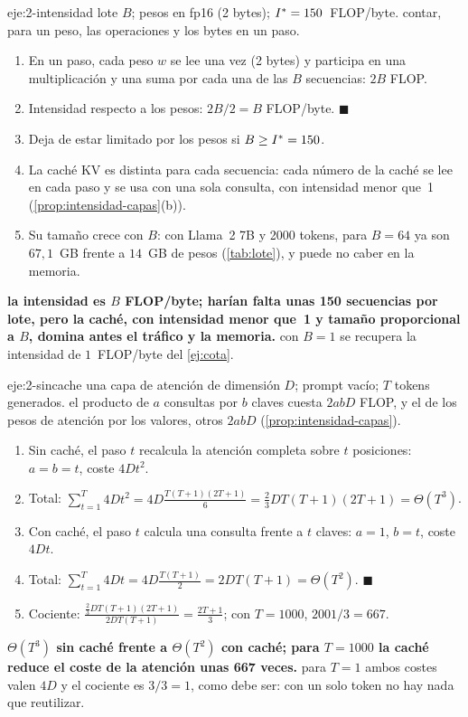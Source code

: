 \begin{solucion}{eje:2-intensidad}
\datos lote $B$; pesos en fp16 (2 bytes); $I^{\ast}=150$~FLOP/byte.
\planteamiento contar, para un peso, las operaciones y los bytes en un paso.
\pasos
\begin{enumerate}[label=\arabic*.]
  \item En un paso, cada peso $w$ se lee una vez (2 bytes) y participa en una multiplicación y una suma por cada una de las $B$ secuencias: $2B$ FLOP.
  \item Intensidad respecto a los pesos: $2B/2=B$ FLOP/byte. \hfill$\blacksquare$
  \item Deja de estar limitado por los pesos si $B\ge I^{\ast}=150$.
  \item La caché KV es distinta para cada secuencia: cada número de la caché se lee en cada paso y se usa con una sola consulta, con intensidad menor que~1 (\cref{prop:intensidad-capas}(b)).
  \item Su tamaño crece con $B$: con Llama~2 7B y 2000 tokens, para $B=64$ ya son $67{,}1$~GB frente a $14$~GB de pesos (\cref{tab:lote}), y puede no caber en la memoria.
\end{enumerate}
\resultado \textbf{la intensidad es $B$ FLOP/byte; harían falta unas 150 secuencias por lote, pero la caché, con intensidad menor que~1 y tamaño proporcional a $B$, domina antes el tráfico y la memoria.}
\comprobacion con $B=1$ se recupera la intensidad de $1$~FLOP/byte del \cref{ej:cota}.
\end{solucion}

\begin{solucion}{eje:2-sincache}
\datos una capa de atención de dimensión $D$; prompt vacío; $T$ tokens generados.
\planteamiento el producto de $a$ consultas por $b$ claves cuesta $2abD$ FLOP, y el de los pesos de atención por los valores, otros $2abD$ (\cref{prop:intensidad-capas}).
\pasos
\begin{enumerate}[label=\arabic*.]
  \item Sin caché, el paso $t$ recalcula la atención completa sobre $t$ posiciones: $a=b=t$, coste $4Dt^{2}$.
  \item Total: $\sum_{t=1}^{T}4Dt^{2}=4D\frac{T(T+1)(2T+1)}{6}=\frac23DT(T+1)(2T+1)=\Theta(T^{3})$.
  \item Con caché, el paso $t$ calcula una consulta frente a $t$ claves: $a=1$, $b=t$, coste $4Dt$.
  \item Total: $\sum_{t=1}^{T}4Dt=4D\frac{T(T+1)}{2}=2DT(T+1)=\Theta(T^{2})$. \hfill$\blacksquare$
  \item Cociente: $\frac{\frac23DT(T+1)(2T+1)}{2DT(T+1)}=\frac{2T+1}{3}$; con $T=1000$, $2001/3=667$.
\end{enumerate}
\resultado \textbf{$\Theta(T^{3})$ sin caché frente a $\Theta(T^{2})$ con caché; para $T=1000$ la caché reduce el coste de la atención unas 667 veces.}
\comprobacion para $T=1$ ambos costes valen $4D$ y el cociente es $3/3=1$, como debe ser: con un solo token no hay nada que reutilizar.
\end{solucion}

